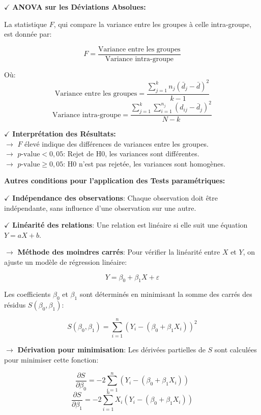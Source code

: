 \textbf{\(\checkmark\)} \textbf{ANOVA sur les Déviations Absolues:}

La statistique \( F \), qui compare la variance entre les groupes à celle intra-groupe, est donnée par:

\[
F = \frac{\text{Variance entre les groupes}}{\text{Variance intra-groupe}}
\]

Où:
\[
\text{Variance entre les groupes} = \frac{\sum_{j=1}^{k} n_j \left( \bar{d}_j - \bar{d} \right)^2}{k - 1}
\]
\[
\text{Variance intra-groupe} = \frac{\sum_{j=1}^{k} \sum_{i=1}^{n_j} \left( d_{ij} - \bar{d}_j \right)^2}{N - k}
\]

\textbf{\(\checkmark\)} \textbf{Interprétation des Résultats:}\\
\noindent \textbf{\(\rightarrow\)} \( F \) élevé indique des différences de variances entre les groupes.\\
\textbf{\(\rightarrow\)} \( p\text{-value} < 0{,}05 \): Rejet de H0, les variances sont différentes.\\
\textbf{\(\rightarrow\)} \( p\text{-value} \geq 0{,}05 \): H0 n'est pas rejetée, les variances sont homogènes.

\textbf{Autres conditions pour l’application des Tests paramétriques:}

\textbf{\(\checkmark\)} \textbf{Indépendance des observations}: Chaque observation doit être indépendante, sans influence d'une observation sur une autre.

\textbf{\(\checkmark\)} \textbf{Linéarité des relations}: Une relation est linéaire si elle suit une équation \( Y = aX + b \).

\noindent \textbf{\(\rightarrow\)} \textbf{Méthode des moindres carrés}: Pour vérifier la linéarité entre \( X \) et \( Y \), on ajuste un modèle de régression linéaire:

\[
Y = \beta_0 + \beta_1 X + \varepsilon
\]

Les coefficients \( \beta_0 \) et \( \beta_1 \) sont déterminés en minimisant la somme des carrés des résidus \( S(\beta_0, \beta_1) \):

\[
S(\beta_0, \beta_1) = \sum_{i=1}^{n} \left( Y_i - (\beta_0 + \beta_1 X_i) \right)^2
\]

\noindent \textbf{\(\rightarrow\)} \textbf{Dérivation pour minimisation}: Les dérivées partielles de \( S \) sont calculées pour minimiser cette fonction:

\[
\frac{\partial S}{\partial \beta_0} = -2 \sum_{i=1}^{n} \left( Y_i - (\beta_0 + \beta_1 X_i) \right)
\]
\[
\frac{\partial S}{\partial \beta_1} = -2 \sum_{i=1}^{n} X_i \left( Y_i - (\beta_0 + \beta_1 X_i) \right)
\]

